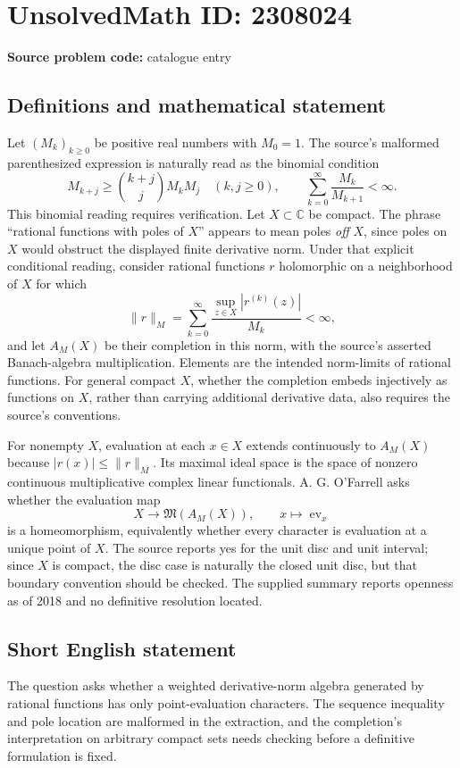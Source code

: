 \documentclass[11pt]{article}
\newcommand{\C}{\mathbb{C}}
\begin{document}
\section*{UnsolvedMath ID: 2308024}
\textbf{Source problem code:} catalogue entry
\subsection{Definitions and mathematical statement}
Let $(M_k)_{k\geq0}$ be positive real numbers with $M_0=1$. The source's malformed parenthesized expression is naturally read as the binomial condition
\[
M_{k+j}\geq\binom{k+j}{j}M_kM_j\quad(k,j\geq0),
\qquad \sum_{k=0}^\infty\frac{M_k}{M_{k+1}}<\infty.
\]
This binomial reading requires verification. Let $X\subset\C$ be compact. The phrase ``rational functions with poles of $X$'' appears to mean poles \emph{off} $X$, since poles on $X$ would obstruct the displayed finite derivative norm. Under that explicit conditional reading, consider rational functions $r$ holomorphic on a neighborhood of $X$ for which
\[
\|r\|_M=\sum_{k=0}^\infty\frac{\sup_{z\in X}|r^{(k)}(z)|}{M_k}<\infty,
\]
and let $A_M(X)$ be their completion in this norm, with the source's asserted Banach-algebra multiplication. Elements are the intended norm-limits of rational functions. For general compact $X$, whether the completion embeds injectively as functions on $X$, rather than carrying additional derivative data, also requires the source's conventions.

For nonempty $X$, evaluation at each $x\in X$ extends continuously to $A_M(X)$ because $|r(x)|\leq\|r\|_M$. Its maximal ideal space is the space of nonzero continuous multiplicative complex linear functionals. A. G. O'Farrell asks whether the evaluation map
\[
X\longrightarrow\mathfrak M(A_M(X)),\qquad x\longmapsto\operatorname{ev}_x
\]
is a homeomorphism, equivalently whether every character is evaluation at a unique point of $X$. The source reports yes for the unit disc and unit interval; since $X$ is compact, the disc case is naturally the closed unit disc, but that boundary convention should be checked. The supplied summary reports openness as of 2018 and no definitive resolution located.
\subsection{Short English statement}
The question asks whether a weighted derivative-norm algebra generated by rational functions has only point-evaluation characters. The sequence inequality and pole location are malformed in the extraction, and the completion's interpretation on arbitrary compact sets needs checking before a definitive formulation is fixed.
\end{document}
